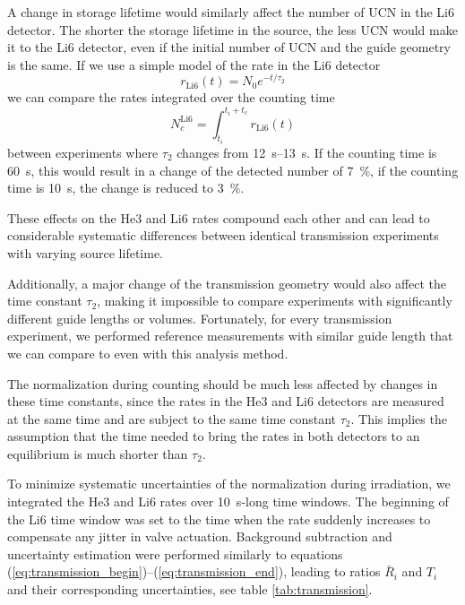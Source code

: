 \documentclass[10pt,letterpaper]{article}
\begin{document}
A change in storage lifetime would similarly affect the number of UCN in the Li6 detector. The shorter the storage lifetime in the source, the less UCN would make it to the Li6 detector, even if the initial number of UCN and the guide geometry is the same. If we use a simple model of the rate in the Li6 detector
\begin{equation}
r_\mathrm{Li6}(t) = N_0 e^{-t/\tau_2}
\end{equation}
we can compare the rates integrated over the counting time
\begin{equation}
N^\mathrm{Li6}_c = \int_{t_i}^{t_i+t_c} r_\mathrm{Li6}(t)
\end{equation}
between experiments where $\tau_2$ changes from \SIrange{12}{13}{\second}. If the counting time is \SI{60}{\second}, this would result in a change of the detected number of \SI{7}{\percent}, if the counting time is \SI{10}{\second}, the change is reduced to \SI{3}{\percent}.

These effects on the He3 and Li6 rates compound each other and can lead to considerable systematic differences between identical transmission experiments with varying source lifetime.

Additionally, a major change of the transmission geometry would also affect the time constant $\tau_2$, making it impossible to compare experiments with significantly different guide lengths or volumes. Fortunately, for every transmission experiment, we performed reference measurements with similar guide length that we can compare to even with this analysis method.

The normalization during counting should be much less affected by changes in these time constants, since the rates in the He3 and Li6 detectors are measured at the same time and are subject to the same time constant $\tau_2$. This implies the assumption that the time needed to bring the rates in both detectors to an equilibrium is much shorter than $\tau_2$.

To minimize systematic uncertainties of the normalization during irradiation, we integrated the He3 and Li6 rates over \SI{10}{\second}-long time windows. The beginning of the Li6 time window was set to the time when the rate suddenly increases to compensate any jitter in valve actuation. Background subtraction and uncertainty estimation were performed similarly to equations (\ref{eq:transmission_begin})--(\ref{eq:transmission_end}), leading to ratios $\bar{R}_i$ and $T_i$ and their corresponding uncertainties, see table \ref{tab:transmission}.
\end{document}
